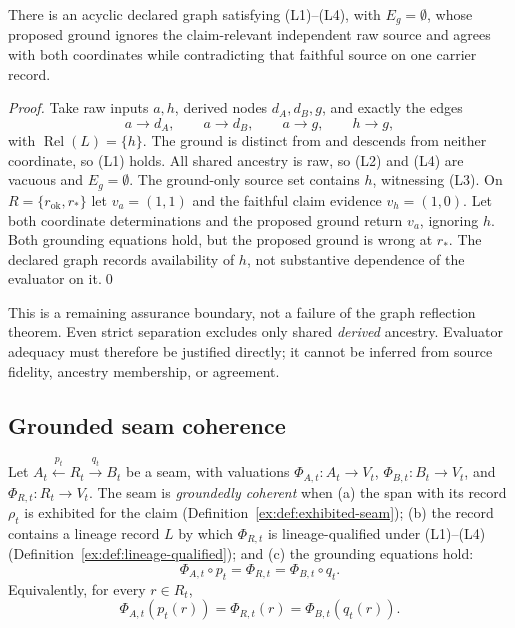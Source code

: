 \documentclass[twocolumn,envcountsect,envcountsame,natbib]{svjour3}
\begin{document}
\begin{proposition}\label{ex:prop:raw-ignored-source}
There is an acyclic declared graph satisfying (L1)--(L4), with $E_g=\emptyset$, whose proposed ground ignores the claim-relevant independent raw source and agrees with both coordinates while contradicting that faithful source on one carrier record.
\end{proposition}
\begin{proof}
Take raw inputs $a,h$, derived nodes $d_A,d_B,g$, and exactly the edges
\[
a\to d_A,\qquad a\to d_B,\qquad a\to g,\qquad h\to g,
\]
with $\operatorname{Rel}(L)=\{h\}$. The ground is distinct from and descends from neither coordinate, so (L1) holds. All shared ancestry is raw, so (L2) and (L4) are vacuous and $E_g=\emptyset$. The ground-only source set contains $h$, witnessing (L3). On $R=\{r_{\mathrm{ok}},r_*\}$ let $v_a=(1,1)$ and the faithful claim evidence $v_h=(1,0)$. Let both coordinate determinations and the proposed ground return $v_a$, ignoring $h$. Both grounding equations hold, but the proposed ground is wrong at $r_*$. The declared graph records availability of $h$, not substantive dependence of the evaluator on it.\qed
\end{proof}

This is a remaining assurance boundary, not a failure of the graph reflection theorem. Even strict separation excludes only shared \emph{derived} ancestry. Evaluator adequacy must therefore be justified directly; it cannot be inferred from source fidelity, ancestry membership, or agreement.

\subsection{Grounded seam coherence}\label{ex:sec:grounded-coherence}

\begin{definition}\label{ex:def:grounded-seam}
Let $A_t \xleftarrow{p_t} R_t
\xrightarrow{q_t} B_t$ be a seam, with valuations
$\Phi_{A,t}:A_t\to V_t$, $\Phi_{B,t}:B_t\to V_t$, and
$\Phi_{R,t}:R_t\to V_t$. The seam is \emph{groundedly coherent} when (a) the span with its record $\rho_t$ is exhibited for the claim (Definition~\ref{ex:def:exhibited-seam}); (b) the record contains a lineage record $L$ by which $\Phi_{R,t}$ is lineage-qualified under (L1)--(L4) (Definition~\ref{ex:def:lineage-qualified}); and (c) the grounding equations hold:
\[
\Phi_{A,t}\circ p_t
=\Phi_{R,t}
=\Phi_{B,t}\circ q_t.
\]
Equivalently, for every $r\in R_t$,
\[
\Phi_{A,t}(p_t(r))
=\Phi_{R,t}(r)
=\Phi_{B,t}(q_t(r)).
\]
\end{definition}
\end{document}
